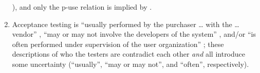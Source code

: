 \begin{enumerate}
          \citealp[p.~424]{vanVliet2000}), and only the \acs{p-use} relation is
          implied by \citet[Fig.~F.1]{IEEE2021c}.
    \item %
          Acceptance testing is ``usually performed by the purchaser \dots{}
          with the \dots{} vendor'' \citep[p.~5]{IEEE2017}, ``may or may not
          involve the developers of the system'' \citep[p.~4\=/6]{SWEBOK2014},
          and/or ``is often performed under supervision of the user
          organization'' \citep[p.~439]{vanVliet2000}; these descriptions
          of who the testers are contradict each other \emph{and} all introduce
          some uncertainty
          (``usually'', ``may or may not'', and ``often'', respectively).


\end{enumerate}
